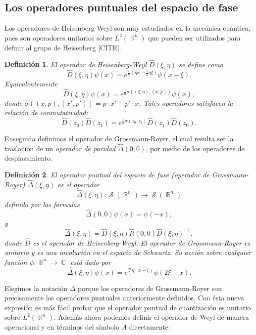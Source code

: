 \documentclass[a4paper]{report}
\DeclareMathOperator{\R}{\mathbb{R}}
\DeclareMathOperator{\C}{\mathbb{C}}
\DeclareMathOperator{\Sz}{\mathcal S}
\newtheorem{definition}{Definición}
\begin{document}
  \subsection{Los operadores puntuales del espacio de fase}

  Los operadores de Heisenberg-Weyl son muy estudiados en la
  mecánica cuántica, pues son operadores unitarios sobre
  $L^2(\R^{n})$ que pueden ser utilizados para definir al
  grupo de Heisenberg [CITE].

  \begin{definition}
    El operador de Heisenberg-Weyl $\hat{D}(\xi,\eta)$ se
    define como
    \[
      \hat{D}(\xi,\eta)\psi(x)
      = e^{\frac{i}{\hbar} (\eta x - \frac{1}{2} \eta
      \xi)}\psi(x - \xi).
    \] 
    Equivalentemente
    \[
      \hat{D}(\xi,\eta)\psi(x)
      = e^{\frac{i}{\hbar} \sigma((\xi,\eta),
      (\hat{x},\hat{p}))}\psi(x),
    \] 
    donde $\sigma((x,p),(x',p')) = p \cdot x' - p' \cdot x$.
    Tales operadores satisfacen la relación de
    conmutatividad:
    \[
      \hat{D}(z_0)\hat{D}(z_1)
      = e^{\frac{i}{\hbar} \sigma(z_0,z_1)}
      \hat{D}(z_1)\hat{D}(z_0).
    \] 
  \end{definition}
  Enseguida definimos el operador de Grossmann-Royer, el
  cual resulta ser la traslación de un \textit{operador de
  paridad} $\hat \Delta(0,0)$, por medio de los operadores
  de desplazamiento.
  \begin{definition}
    El operador puntual del espacio de fase (operador de
    Grossmann-Royer) $\hat{\Delta}(\xi,\eta)$ es el operador
    \[
      \hat{\Delta}(\xi,\eta) : \Sz(\R^{n}) \to \Sz(\R^{n})
    \] 
    definido por las formulas 
    \[
      \hat{\Delta}(0,0)\psi(x)
      = \psi(-x),
    \]
    y
    \[
      \hat{\Delta}(\xi,\eta)
      = \hat{D}(\xi,\eta) \hat{R}(0,0)
      \hat{D}(\xi,\eta)^{-1},
    \] 
    donde $\hat D$ es el operador de Heisenberg-Weyl. El
    operador de Grossmann-Royer es unitario y es una
    involución en el espacio de Schwartz. Su acción sobre
    cualquier función $\psi : \R^{n} \to \C$ está dado por
    \[
      \hat{\Delta}(\xi,\eta)\psi(x)
      = e^{\frac{2i}{\hbar} \eta (x - \xi)}\psi(2\xi - x).
    \] 
  \end{definition}
  Elegimos la notación $\Delta$ porque los operadores de
  Grossmann-Royer son precisamente los operadores puntuales
  anteriormente definidos. Con ésta nueva expresión es más
  fácil probar que el operador puntual de cuantización es
  unitario sobre $L^2(\R^{n})$.  Además ahora podemos
  definir el operador de Weyl de manera operacional y en
  términos del símbolo $A$ directamente:
  
\end{document}
